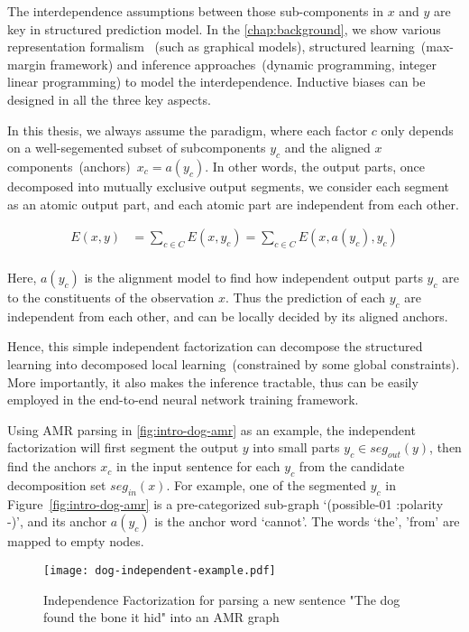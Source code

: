 The interdependence assumptions between those sub-components in $x$
and $y$ are key in structured prediction model. In the
\autoref{chap:background}, we show various representation formalism
~(such as graphical models), structured learning~(max-margin
framework) and inference approaches~(dynamic programming, integer
linear programming) to model the interdependence. Inductive biases can
be designed in all the three key aspects.

In this thesis, we always assume the 
paradigm, where each factor $c$ only depends on a well-segemented
subset of subcomponents $y_{c}$ and the aligned $x$
components~(anchors)~$x_{c}=a(y_{c})$. In other words, the output
parts, once decomposed into mutually exclusive output segments, we
consider each segment as an atomic output part, and each atomic part
are independent from each other.

\begin{equation}
    \label{eq:independent-factor}
    \begin{split}
    E(x, y) & =\sum_{c \in C} E(x, y_{c}) = \sum_{c \in C}E(x, a(y_{c}), y_{c})  \\
    \end{split}
\end{equation}

Here, $a(y_{c})$ is the alignment model to find how independent output
parts $y_{c}$ are  to the constituents of the observation
$x$. Thus the prediction of each $y_{c}$ are independent from each
other, and can be locally decided by its aligned anchors.

Hence, this simple independent factorization can decompose the
structured learning into decomposed local learning~(constrained by
some global constraints). More importantly, it also makes the
inference tractable, thus can be easily employed in the end-to-end
neural network training framework.

Using AMR parsing in \autoref{fig:intro-dog-amr} as an example, the
independent factorization will first segment the output $y$ into small
parts $y_{c} \in seg_{out}(y)$, then find the anchors $x_{c}$ in the
input sentence for each $y_{c}$ from the candidate decomposition set
$seg_{in}(x)$. For example, one of the segmented $y_{c}$ in
Figure~\ref{fig:intro-dog-amr} is a pre-categorized sub-graph
`(possible-01 :polarity -)', and its anchor $a(y_{c})$ is the anchor
word `cannot'. The words `the', 'from' are mapped to empty nodes.

\begin{figure}[!th]
\centering
\texttt{[image: dog-independent-example.pdf]}
\caption{\label{fig:intro-independent-example}Independence
  Factorization for parsing a new sentence "The dog found the bone it
  hid" into an AMR graph}
\end{figure}

